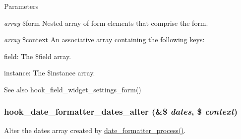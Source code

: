 \begin{DoxyParams}{Parameters}
\item[{\em array}]\$form Nested array of form elements that comprise the form. \item[{\em array}]\$context An associative array containing the following keys:
\begin{DoxyItemize}
\item field: The \$field array.
\item instance: The \$instance array.
\end{DoxyItemize}\end{DoxyParams}
\begin{DoxySeeAlso}{See also}
hook\_\-field\_\-widget\_\-settings\_\-form() 
\end{DoxySeeAlso}
\hypertarget{date_8api_8php_aae52e9a3c4d3926f92ace9b0ec0041f4}{
\subsubsection[{hook\_\-date\_\-formatter\_\-dates\_\-alter}]{\setlength{\rightskip}{0pt plus 5cm}hook\_\-date\_\-formatter\_\-dates\_\-alter (\&\$ {\em dates}, \/  \$ {\em context})}}
\label{date_8api_8php_aae52e9a3c4d3926f92ace9b0ec0041f4}
Alter the dates array created by \hyperlink{date_8module_a4b019297d5d8f388aa2252ad62b3bfde}{date\_\-formatter\_\-process()}.


